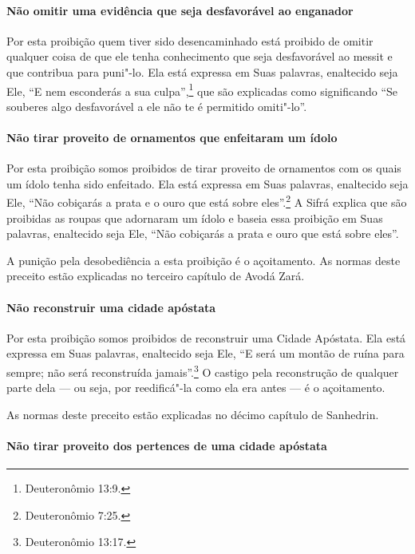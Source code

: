 \begin{multicols}{2}
\paragraph{Não omitir uma evidência que seja desfavorável ao enganador}

Por esta proibição quem tiver sido desencaminhado está proibido de
omitir qualquer coisa de que ele tenha conhecimento que seja
desfavorável ao messit\starr{} e que contribua para puni"-lo. Ela está expressa em Suas
palavras, enaltecido seja Ele, ``E nem esconderás a sua culpa'',\footnote{Deuteronômio 13:9.} que são explicadas como significando ``Se souberes
algo desfavorável a ele não te é permitido omiti"-lo''.

\paragraph{Não tirar proveito de ornamentos que enfeitaram um ídolo}

Por esta proibição somos proibidos de tirar proveito de ornamentos com
os quais um ídolo tenha sido enfeitado. Ela está expressa em Suas
palavras, enaltecido seja Ele, ``Não cobiçarás a prata e o ouro que está
sobre eles''.\footnote{Deuteronômio 7:25.} A Sifrá\starr{} explica que são proibidas as
roupas que adornaram um ídolo e baseia essa proibição em Suas palavras,
enaltecido seja Ele, ``Não cobiçarás a prata e ouro que está sobre
eles''.

A punição pela desobediência a esta proibição é o açoitamento. As normas
deste preceito estão explicadas no terceiro capítulo de Avodá Zará\starr.

\paragraph{Não reconstruir uma cidade apóstata}

Por esta proibição somos proibidos de reconstruir uma Cidade Apóstata.
Ela está expressa em Suas palavras, enaltecido seja Ele, ``E será um
montão de ruína para sempre; não será reconstruída jamais''.\footnote{Deuteronômio 13:17.} O castigo pela reconstrução de qualquer parte dela
--- ou seja, por reedificá"-la como ela era antes --- é o açoitamento.


As normas deste preceito estão explicadas no décimo capítulo de Sanhedrin\starr.

\paragraph{Não tirar proveito dos pertences de uma cidade apóstata}


\end{multicols}
